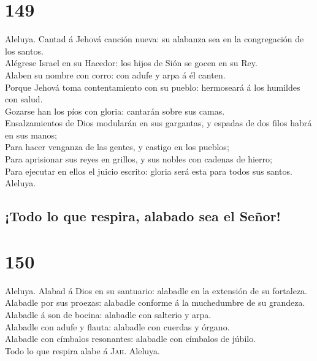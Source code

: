 \hypertarget{section-148}{%
\section{149}\label{section-148}}

 Aleluya. Cantad á Jehová canción nueva: su alabanza sea
en la congregación de los santos.\\
 Alégrese Israel en su Hacedor: los hijos de Sión se gocen
en su Rey.\\
 Alaben su nombre con corro: con adufe y arpa á él
canten.\\
 Porque Jehová toma contentamiento con su pueblo:
hermoseará á los humildes con salud.\\
 Gozarse han los píos con gloria: cantarán sobre sus
camas.\\
 Ensalzamientos de Dios modularán en sus gargantas, y
espadas de dos filos habrá en sus manos;\\
 Para hacer venganza de las gentes, y castigo en los
pueblos;\\
 Para aprisionar sus reyes en grillos, y sus nobles con
cadenas de hierro;\\
 Para ejecutar en ellos el juicio escrito: gloria será
esta para todos sus santos. Aleluya.

\hypertarget{todo-lo-que-respira-alabado-sea-el-seuxf1or}{%
\subsection{¡Todo lo que respira, alabado sea el
Señor!}\label{todo-lo-que-respira-alabado-sea-el-seuxf1or}}

\hypertarget{section-149}{%
\section{150}\label{section-149}}

 Aleluya. Alabad á Dios en su santuario: alabadle en la
extensión de su fortaleza.\\
 Alabadle por sus proezas: alabadle conforme á la
muchedumbre de su grandeza.\\
 Alabadle á son de bocina: alabadle con salterio y arpa.\\
 Alabadle con adufe y flauta: alabadle con cuerdas y
órgano.\\
 Alabadle con címbalos resonantes: alabadle con címbalos
de júbilo.\\
 Todo lo que respira alabe á \textsc{Jah}. Aleluya.
